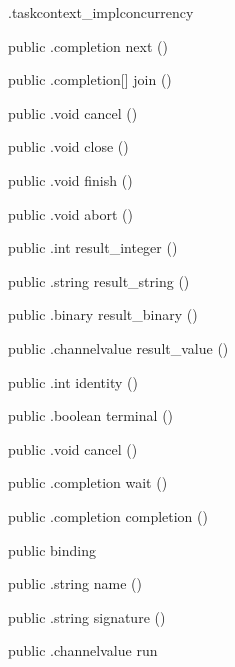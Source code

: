 \begin{CrexxClass}{.taskcontext\_impl}{concurrency}
\begin{Members}
    \Method
      {public}
      {.completion}
      {next}
      {()}

    \Method
      {public}
      {.completion[]}
      {join}
      {()}

    \Method
      {public}
      {.void}
      {cancel}
      {()}

    \Method
      {public}
      {.void}
      {close}
      {()}

    \Method
      {public}
      {.void}
      {finish}
      {()}

    \Method
      {public}
      {.void}
      {abort}
      {()}

    \Method
      {public}
      {.int}
      {result\_integer}
      {()}

    \Method
      {public}
      {.string}
      {result\_string}
      {()}

    \Method
      {public}
      {.binary}
      {result\_binary}
      {()}

    \Method
      {public}
      {.channelvalue}
      {result\_value}
      {()}

    \Method
      {public}
      {.int}
      {identity}
      {()}

    \Method
      {public}
      {.boolean}
      {terminal}
      {()}

    \Method
      {public}
      {.void}
      {cancel}
      {()}

    \Method
      {public}
      {.completion}
      {wait}
      {()}

    \Method
      {public}
      {.completion}
      {completion}
      {()}

    \Factory
      {public}
      {binding}
      {}

    \Method
      {public}
      {.string}
      {name}
      {()}

    \Method
      {public}
      {.string}
      {signature}
      {()}

    \Method
      {public}
      {.channelvalue}
      {run}
      {}


\end{Members}
\end{CrexxClass}
